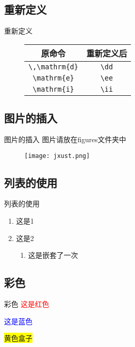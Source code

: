 \documentclass{jxustbeamer}
\begin{document}
\subsection{重新定义}
\begin{frame}[fragile]{重新定义}
	\begin{figure}[h]
		\begin{tabular}{|c|c|}
			\hline
			原命令 & 重新定义后\\
			\hline
			\verb|\,\mathrm{d}| & \verb|\dd|\\
			\hline
			\verb|\mathrm{e}| & \verb|\ee|\\
			\hline
			\verb|\mathrm{i}| & \verb|\ii|\\
			\hline
		\end{tabular}
	\end{figure}
\end{frame}
\subsection{图片的插入}
\begin{frame}{图片的插入}
	图片请放在figures文件夹中
	\begin{figure}[h]
		\centering
		\texttt{[image: jxust.png]}
	\end{figure}
	
\end{frame}
\subsection{列表的使用}
\begin{frame}{列表的使用}
	\begin{enumerate}
		\item 这是1
		\item 这是2
		\begin{enumerate}
			\item 这是嵌套了一次
		\end{enumerate}
	\end{enumerate}
\end{frame}

\subsection{彩色}
\begin{frame}{彩色}
	\textcolor{red}{这是红色}
	
	\textcolor{blue}{这是蓝色}
	
	\colorbox{yellow}{黄色盒子}
	
\end{frame}
\end{document}
